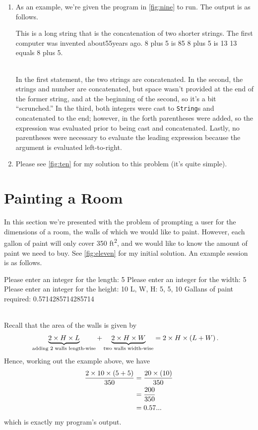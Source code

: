 \documentclass[leqno, 11pt]{article}
\begin{document}
\begin{enumerate}
  \item As an example, we're given the program in \autoref{fig:nine} to run. The output is as follows.
        \begin{verbbox}[\mbox{}\scriptsize]
This is a long string that is the concatenation of two shorter strings.
The first computer was invented about55years ago.
8 plus 5 is 85
8 plus 5 is 13
13 equals 8 plus 5.
        \end{verbbox}
        \begin{figure}[h!]
        \centering
        \theverbbox
        \end{figure}\\
        In the first statement, the two strings are concatenated. In the second, the strings and number are concatenated, but space wasn't provided at the end of the former string, and at the beginning of the second, so it's a bit ``scrunched.'' In the third, both integers were cast to \texttt{String}s and concatenated to the end; however, in the forth parentheses were added, so the expression was evaluated prior to being cast and concatenated. Lastly, no parentheses were necessary to evaluate the leading expression because the argument is evaluated left-to-right.
  \item Please see \autoref{fig:ten} for my solution to this problem (it's quite simple).
\end{enumerate}
\section*{Painting a Room}
In this section we're presented with the problem of prompting a user for the dimensions of a room, the walls of which we would like to paint. However, each gallon of paint will only cover 350 \si{ft^{2}}, and we would like to know the amount of paint we need to buy. See \autoref{fig:eleven} for my initial solution. An example session is as follows.
\begin{verbbox}[\mbox{}\scriptsize]
Please enter an integer for the length: 5
Please enter an integer for the width: 5
Please enter an integer for the height: 10
L, W, H: 5, 5, 10
Gallans of paint required: 0.5714285714285714
\end{verbbox}
\begin{figure}[h!]
  \centering
  \theverbbox
\end{figure}\\
Recall that the area of the walls is given by
\begin{align}
  \underbrace{2\times H\times L}_{\text{adding 2 walls length-wise}} + \underbrace{2\times H\times W}_{\text{two walls width-wise}}&=2\times H\times\left(L + W\right).\notag
\end{align}
Hence, working out the example above, we have
\begin{align}
  \dfrac{2\times 10\times \left(5 + 5\right)}{350}&=\dfrac{20\times\left(10\right)}{350}\notag\\&=\dfrac{200}{350}\notag\\&=0.57...\notag
\end{align}
which is exactly my program's output.
\end{document}
